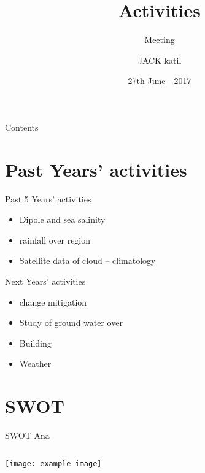 \documentclass[handout,t]{beamer}
\title[IGTDT Centre]{Activities}
\subtitle{Meeting}
\institute[]{\large IGTDT Centre \\ GYUHJUYT}
\date{27th June - 2017}
\author[ Meeting]{JACK katil}
\begin{document}

\frame{\titlepage}
\section[]{}
\begin{frame}{Contents}
  \tableofcontents
\end{frame}


\section{Past Years’ activities}
\begin{frame}{Past 5 Years’ activities}
\begin{itemize}
    \item  Dipole and sea salinity
    \item  rainfall over  region
    \item Satellite data of cloud –  climatology    
\end{itemize}
\end{frame}


\begin{frame}{Next Years’ activities}
\begin{itemize}
    \item change mitigation
    \item Study of ground water over 
    \item Building 
    \item Weather 
\end{itemize}
\end{frame}
\section{SWOT}
\begin{frame}{SWOT Ana}
\begin{columns}
\begin{column}{1\textwidth}
    \texttt{[image: example-image]}
\end{column}
\end{columns}
\end{frame}
\end{document}
